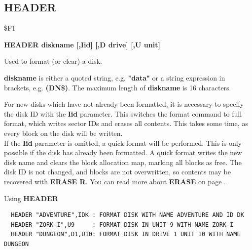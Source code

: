 \subsection{HEADER}
\begin{description}[leftmargin=2cm,style=nextline]
\item [Token:] \$F1
\item [Format:] {\bf HEADER diskname [,Iid] [,D drive] [,U unit] }
\item [Usage:]
   Used to format (or clear) a disk.

   {\bf diskname} is either a quoted string, e.g. {\bf "data"} or
   a string expression in brackets, e.g. {\bf (DN\$)}.
   The maximum length of {\bf diskname} is 16 characters.

   \drivedefinition

   \unitdefinition

\item [Remarks:]
   For new disks which have not already been formatted,
   it is necessary to specify the disk ID with the
   {\bf Iid} parameter. This switches the format command to
   full format, which writes sector IDs and erases all contents.
   This takes some time, as every block on the disk will
   be written. \\
   If the {\bf Iid} parameter is omitted, a quick format will
   be performed. This is only possible if the disk has already been formatted.
   A quick format writes the new disk name and clears the
   block allocation map, marking all blocks as free.
   The disk ID is not changed, and blocks are not overwritten,
   so contents may be recovered with {\bf ERASE R}.
   You can read more about {\bf ERASE} on page \pageref{erasecommand}.

\item [Examples:] Using {\bf HEADER}
\begin{tcolorbox}[colback=black,coltext=white]
\verbatimfont{\codefont}
\begin{verbatim}
  HEADER "ADVENTURE",IDK : FORMAT DISK WITH NAME ADVENTURE AND ID DK
  HEADER "ZORK-I",U9     : FORMAT DISK IN UNIT 9 WITH NAME ZORK-I
  HEADER "DUNGEON",D1,U10: FORMAT DISK IN DRIVE 1 UNIT 10 WITH NAME DUNGEON
\end{verbatim}
\end{tcolorbox}
\end{description}


\newpage

